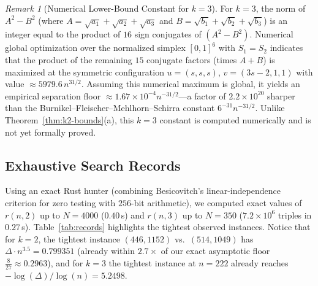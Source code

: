 \documentclass[11pt,a4paper]{article}
\theoremstyle{definition}
\theoremstyle{remark}
\newtheorem{remark}[theorem]{Remark}
\begin{document}
\begin{remark}[Numerical Lower-Bound Constant for $k = 3$]
For $k = 3$, the norm of $A^2 - B^2$ (where $A = \sqrt{a_1} + \sqrt{a_2} + \sqrt{a_3}$ and $B = \sqrt{b_1} + \sqrt{b_2} + \sqrt{b_3}$) is an integer equal to the product of $16$ sign conjugates of $(A^2 - B^2)$. Numerical global optimization over the normalized simplex $[0, 1]^6$ with $S_1 = S_2$ indicates that the product of the remaining $15$ conjugate factors (times $A + B$) is maximized at the symmetric configuration $u = (s, s, s)$, $v = (3s - 2, 1, 1)$ with value $\approx 5979.6\, n^{31/2}$. Assuming this numerical maximum is global, it yields an empirical separation floor $\approx 1.67 \times 10^{-4} n^{-31/2}$---a factor of $2.2 \times 10^{20}$ sharper than the Burnikel--Fleischer--Mehlhorn--Schirra constant $6^{-31} n^{-31/2}$. Unlike Theorem~\ref{thm:k2-bounds}(a), this $k = 3$ constant is computed numerically and is not yet formally proved.
\end{remark}

\subsection{Exhaustive Search Records}

Using an exact Rust hunter (combining Besicovitch's linear-independence criterion for zero testing with $256$-bit arithmetic), we computed exact values of $r(n, 2)$ up to $N = 4000$ ($0.40\,$s) and $r(n, 3)$ up to $N = 350$ ($7.2 \times 10^6$ triples in $0.27\,$s). Table~\ref{tab:records} highlights the tightest observed instances. Notice that for $k = 2$, the tightest instance $(446, 1152)$ vs.\ $(514, 1049)$ has $\Delta \cdot n^{3.5} = 0.799351$ (already within $2.7\times$ of our exact asymptotic floor $\frac{8}{27} \approx 0.2963$), and for $k = 3$ the tightest instance at $n = 222$ already reaches $-\log(\Delta)/\log(n) = 5.2498$.
\end{document}
